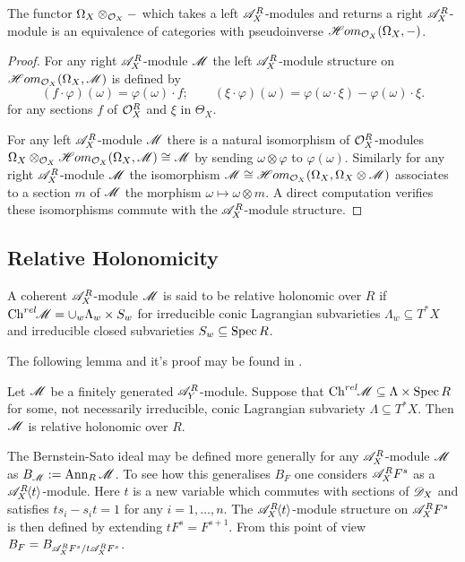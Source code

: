 \begin{lemma}
  The functor $\Omega_X\otimes_{\mathcal{O}_X}{-}$ which takes a left $\mathscr{A}_X^R$-modules and returns a right $\mathscr{A}_X^R$-module is an equivalence of categories with pseudoinverse  $\mathscr{H}om_{\mathcal{O}_X}(\Omega_X,{-})$.
\end{lemma}
\begin{proof}
  For any right $\mathscr{A}_X^R$-module $\mathscr{M}$ the left $\mathscr{A}_X^R$-module structure on $\mathscr{H}om_{\mathcal{O}_X}(\Omega_X, \mathscr{M})$ is defined by
  $$(f \cdot \varphi)(\omega)= \varphi(\omega)\cdot f; \qquad (\xi\cdot \varphi)(\omega) = \varphi(\omega \cdot \xi) - \varphi(\omega)\cdot \xi. $$
  for any sections $f$ of $\mathcal{O}_X^R$ and $\xi$ in $\Theta_X$.

  For any left $\mathscr{A}_X^R$-module $\mathscr{M}$ there is a natural isomorphism of $\mathcal{O}_X^R$-modules $\Omega_X\otimes_{\mathcal{O}_X}\mathscr{H} om _{\mathcal{O}_X}(\Omega_X, \mathscr{M}) \cong \mathscr{M}$ by sending $\omega \otimes \varphi$ to $\varphi(\omega)$.
  Similarly for any right $\mathscr{A}_X^R$-module $\mathscr{M}$ the isomorphism $\mathscr{M} \cong \mathscr{H} om_{\mathcal{O}_X}(\Omega_X, \Omega_X\otimes \mathscr{M})$ associates to a section $m$ of $\mathscr{M}$ the morphism $\omega \mapsto \omega \otimes m$.
  A direct computation verifies these isomorphisms commute with the $\mathscr{A}_X^R$-module structure.
\end{proof}

\subsection{Relative Holonomicity}
A coherent $\mathscr{A}_X^R$-module $\mathscr{M}$ is said to be relative holonomic over $R$ if $\operatorname{Ch}^{rel}\mkern-5mu \mathscr{M} = \cup_w \Lambda_w \times S_w$
for irreducible conic Lagrangian subvarieties $\Lambda_w\subseteq T^*X$ and irreducible closed subvarieties $S_w\subseteq \operatorname{Spec} R$.

The following lemma and it's proof may be found in \cite{maisonobe2016filtration}.
\begin{lemma}\label{lem: InclusionCharVar}
  Let $\mathscr{M}$ be a finitely generated $\mathscr{A}_Y^R$-module. Suppose that $\operatorname{Ch}^{rel}\mkern-5mu \mathscr{M} \subseteq \Lambda \times \operatorname{Spec} R$ for some, not necessarily irreducible, conic Lagrangian subvariety $\Lambda\subseteq T^*X$. Then $\mathscr{M}$ is relative holonomic over $R$.
\end{lemma}
The Bernstein-Sato ideal may be defined more generally for any $\mathscr{A}_X^R$-module $\mathscr{M}$ as $B_{\mathscr{M}} := \operatorname{Ann}_{R}\mathscr{M}$. To see how this generalises $B_F$ one considers $\mathscr{A}_X^R F^s$ as a $\mathscr{A}_X^R\mkern-5mu\left\langle t \right\rangle$-module.
Here $t$ is a new variable which commutes with sections of $\mathscr{D}_X$ and satisfies $ts_i - s_it = 1$ for any $i=1,\ldots, n$.  The $\mathscr{A}_X^R\mkern-5mu\left\langle t \right\rangle$-module structure on $\mathscr{A}_X^R F^s$ is then defined by extending $tF^s = F^{s + 1}$. From this point of view $B_F = B_{\mathscr{A}_X^R F^s / t\mathscr{A}_X^R F^s}$.

